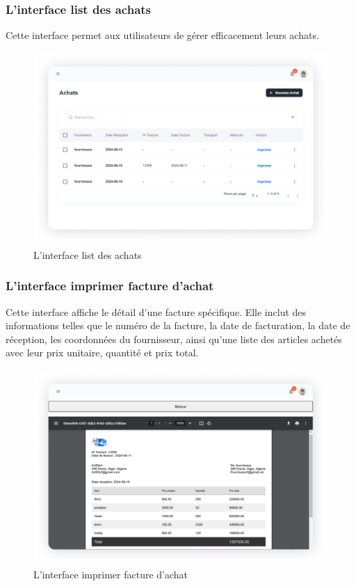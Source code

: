 \documentclass[edit,12pt,a4paper,ChapStyle,oneside,doubleinterligne]{report}
\begin{document}
\subsubsection{L'interface list des achats}
Cette interface permet aux utilisateurs de gérer efficacement leurs achats.

\begin{figure} [H]
    \centering
    \includegraphics[width=1\textwidth]{images/facture.png}
    \caption{L'interface list des achats}
    \label{fig:Commands recus}
\end{figure}
\subsubsection{L'interface imprimer facture d'achat}
Cette interface affiche le détail d'une facture spécifique. Elle inclut des informations telles que le numéro de la facture, la date de facturation, la date de réception, les coordonnées du fournisseur, ainsi qu'une liste des articles achetés avec leur prix unitaire, quantité et prix total.
\begin{figure} [H]
    \centering
    \includegraphics[width=1\textwidth]{images/facture2.png}
    \caption{L'interface imprimer facture d'achat}
    \label{fig:Commands recus}
\end{figure}
\end{document}
